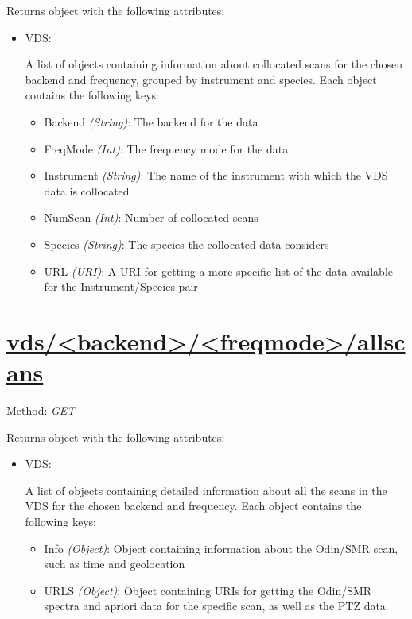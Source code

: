 Returns object with the following attributes:
\begin{itemize}
    \item VDS:

        A list of objects containing information about collocated scans for
        the chosen backend and frequency, grouped by instrument and species.
        Each object contains the following keys:

        \begin{itemize}
            \item Backend \emph{(String)}: The backend for the data
            \item FreqMode \emph{(Int)}: The frequency mode for the data
            \item Instrument \emph{(String)}: The name of the instrument with
                which the VDS data is collocated
            \item NumScan \emph{(Int)}: Number of collocated scans
            \item Species \emph{(String)}: The species the collocated data
                considers
            \item URL \emph{(URI)}: A URI for getting a more specific list of
                the data available for the Instrument/Species pair
        \end{itemize}
\end{itemize}


\section{\url{vds/<backend>/<freqmode>/allscans}}
Method: \emph{GET}

Returns object with the following attributes:
\begin{itemize}
    \item VDS:

        A list of objects containing detailed information about all the scans
        in the VDS for the chosen backend and frequency.
        Each object contains the following keys:

        \begin{itemize}
            \item Info \emph{(Object)}: Object containing information
                about the Odin/SMR scan, such as time and geolocation
            \item URLS \emph{(Object)}: Object containing URIs for getting the
                Odin/SMR spectra and apriori data for the specific scan, as
                well as the PTZ data
        \end{itemize}
\end{itemize}



